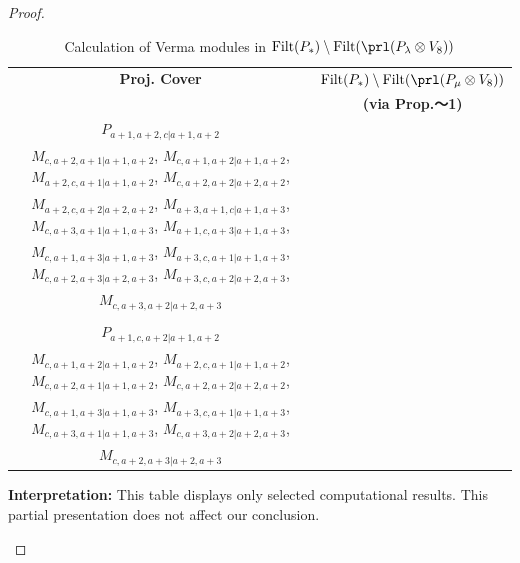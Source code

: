 \begin{proof}
\begin{enumerate}
\begin{enumerate}
\begin{table}[htbp]
\centering
\caption{Calculation of Verma modules in $\operatorname{Filt}(P_*) \setminus \operatorname{Filt}(\prl(P_\lambda \otimes V_{8})) $ } \label{tab:verma-analysis_c_14}
\begin{tabular}{cc}
\toprule
\textbf{Proj. Cover} & \textbf{$\operatorname{Filt}(P_*) \setminus \operatorname{Filt}(\prl(P_\mu \otimes V_{8})) $}  \\
     & \textbf{(via Prop.～1)}  \\
\midrule
 $P_{a+1,a+2,c|a+1,a+2}$ & \makecell{
 $M_{a+2,a+2,c|a+2,a+2}$,
 $M_{a+1,a+3,c|a+1,a+3}$,
 $M_{a+3,a+2,c|a+2,a+3}$,
 $M_{a+2,a+1,c|a+1,a+2}$, \\
 $M_{c,a+2,a+1|a+1,a+2}$,
 $M_{c,a+1,a+2|a+1,a+2}$,
 $M_{a+2,c,a+1|a+1,a+2}$,
 $M_{c,a+2,a+2|a+2,a+2}$, \\
 $M_{a+2,c,a+2|a+2,a+2}$,
 $M_{a+3,a+1,c|a+1,a+3}$,
 $M_{c,a+3,a+1|a+1,a+3}$,
 $M_{a+1,c,a+3|a+1,a+3}$, \\
 $M_{c,a+1,a+3|a+1,a+3}$,
 $M_{a+3,c,a+1|a+1,a+3}$,
 $M_{c,a+2,a+3|a+2,a+3}$,
 $M_{a+3,c,a+2|a+2,a+3}$, \\
 $M_{c,a+3,a+2|a+2,a+3}$
}\\
 & \\
 $P_{a+1,c,a+2|a+1,a+2}$ & \makecell{
 $M_{a+2,c,a+2|a+2,a+2}$,
 $M_{a+1,c,a+3|a+1,a+3}$,
 $M_{a+3,c,a+2|a+2,a+3}$,
 $M_{a+2,c,a+3|a+2,a+3}$, \\
 $M_{c,a+1,a+2|a+1,a+2}$,
 $M_{a+2,c,a+1|a+1,a+2}$,
 $M_{c,a+2,a+1|a+1,a+2}$,
 $M_{c,a+2,a+2|a+2,a+2}$, \\
 $M_{c,a+1,a+3|a+1,a+3}$,
 $M_{a+3,c,a+1|a+1,a+3}$,
 $M_{c,a+3,a+1|a+1,a+3}$,
 $M_{c,a+3,a+2|a+2,a+3}$, \\
 $M_{c,a+2,a+3|a+2,a+3}$
}\\
\bottomrule
\end{tabular}
\vspace{0.5em}
\parbox{\linewidth}{\small
\textbf{Interpretation:}
This table displays only selected computational results. This partial presentation does not affect our conclusion.
}
\end{table}


\end{enumerate}
\end{enumerate}
\end{proof}
